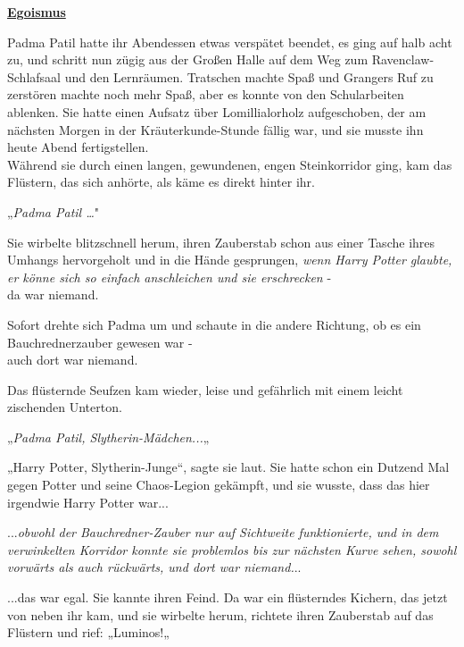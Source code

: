 

\hypertarget{egoismus}{%

\textbf{\uline{Egoismus}}

\hfill\break Padma Patil hatte ihr Abendessen etwas verspätet beendet, es ging auf halb acht zu, und schritt nun zügig aus der Großen Halle auf dem Weg zum Ravenclaw-Schlafsaal und den Lernräumen. Tratschen machte Spaß und Grangers Ruf zu zerstören machte noch mehr Spaß, aber es konnte von den Schularbeiten ablenken. Sie hatte einen Aufsatz über Lomillialorholz aufgeschoben, der am nächsten Morgen in der Kräuterkunde-Stunde fällig war, und sie musste ihn heute Abend fertigstellen.\\ Während sie durch einen langen, gewundenen, engen Steinkorridor ging, kam das Flüstern, das sich anhörte, als käme es direkt hinter ihr.

„\emph{Padma Patil …}"

Sie wirbelte blitzschnell herum, ihren Zauberstab schon aus einer Tasche ihres Umhangs hervorgeholt und in die Hände gesprungen, \emph{wenn Harry Potter glaubte, er könne sich so einfach anschleichen und sie erschrecken} -\\ da war niemand.

Sofort drehte sich Padma um und schaute in die andere Richtung, ob es ein Bauchrednerzauber gewesen war -\\ auch dort war niemand.

Das flüsternde Seufzen kam wieder, leise und gefährlich mit einem leicht zischenden Unterton.

„\emph{Padma Patil, Slytherin-Mädchen...}„

„Harry Potter, Slytherin-Junge“, sagte sie laut. Sie hatte schon ein Dutzend Mal gegen Potter und seine Chaos-Legion gekämpft, und sie wusste, dass das hier irgendwie Harry Potter war...

...\emph{obwohl der Bauchredner-Zauber nur auf Sichtweite funktionierte, und in dem verwinkelten Korridor konnte sie problemlos bis zur nächsten Kurve sehen, sowohl vorwärts als auch rückwärts, und dort war niemand.}..

...das war egal. Sie kannte ihren Feind. Da war ein flüsterndes Kichern, das jetzt von neben ihr kam, und sie wirbelte herum, richtete ihren Zauberstab auf das Flüstern und rief: „Luminos!„

}
